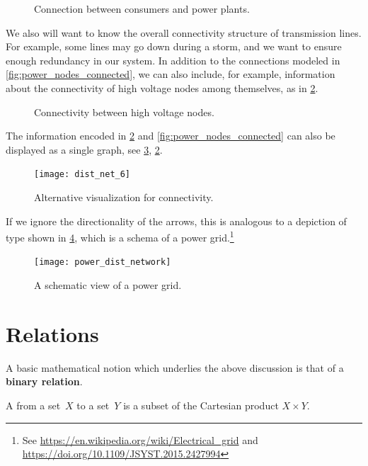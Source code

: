 \begin{figure}[h!]
    \centering
    \caption{Connection between consumers and power plants.}
    \label{fig:power_paths}
\end{figure}


We also will want to know the overall connectivity structure of transmission lines. For example, some lines may go down during a storm, and we want to ensure enough redundancy in our system. In addition to the connections modeled in \cref{fig:power_nodes_connected}, we can also include, for example, information about the connectivity of high voltage nodes among themselves, as in \cref{fig:power_internodal}.

\begin{figure}[h!]
    \centering
    \caption{Connectivity between high voltage nodes.}
    \label{fig:power_internodal}
\end{figure}
The information encoded in \cref{fig:power_internodal} and \cref{fig:power_nodes_connected} can also be displayed as a single graph, see \cref{fig:power_graph},
\cref{fig:power_internodal}.
\begin{figure}[h!]
    \centering
    \texttt{[image: dist\_net\_6]}
    \caption{Alternative visualization for connectivity.}
    \label{fig:power_graph}
\end{figure}
If we ignore the directionality of the arrows, this is analogous to a depiction of type shown in \cref{fig:power_schema}, which is a schema of a power grid.\footnote{See \url{https://en.wikipedia.org/wiki/Electrical_grid} and \url{https://doi.org/10.1109/JSYST.2015.2427994}}

\begin{figure}[h!]
    \centering
    \texttt{[image: power\_dist\_network]}
    \caption{A schematic view of a power grid.}
    \label{fig:power_schema}
\end{figure}


\section{Relations}\label{sec:connection-relations}

A basic mathematical notion which underlies the above discussion is that of a \textbf{binary relation}.


\begin{definition}\label{def:binary-relation}
    A \emph{} from a set~$X$ to a set~$Y$ is a subset of the Cartesian product $X\times Y$.
\end{definition}

